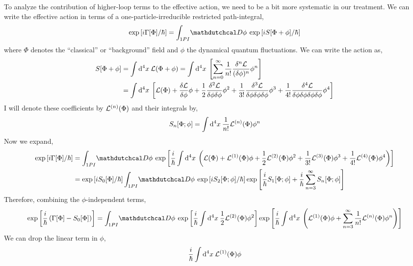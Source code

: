 \documentclass[12pt]{article}
\begin{document}
To analyze the contribution of higher-loop terms to the effective action, we need to be a bit more systematic in our treatment. We can write the effective action in terms of a one-particle-irreducible restricted path-integral,
\[ \exp{\left[ i\Gamma[\Phi] / \hbar \right] } = \int_{1PI} \pathd{\phi} \exp{\left[ i S[\Phi + \phi] / \hbar \right]} \]
where $\Phi$ denotes the ``classical'' or ``background'' field and $\phi$ the dynamical quantum fluctuations. We can write the action as,
\begin{align*}
S[\Phi + \phi] & = \int \mathrm{d}^{4} x \: \mathcal{L}(\Phi + \phi) = \int \mathrm{d}^{4} x \: \left[  \sum_{n = 0}^{\infty} \frac{1}{n!} \frac{\delta^n \mathcal{L}}{(\delta \phi)^n} \phi^n \right]
\\
& = \int \mathrm{d}^{4} x \: \left[  \mathcal{L}(\Phi) + \frac{\delta \mathcal{L}}{\delta \phi} \phi + \frac{1}{2} \frac{\delta^2 \mathcal{L}}{\delta \phi \delta \phi} \phi^2 + \frac{1}{3!} \frac{\delta^3 \mathcal{L}}{\delta \phi \delta \phi \delta \phi} \phi^3 + \frac{1}{4!} \frac{\delta^4 \mathcal{L}}{\delta \phi \delta \phi \delta \phi \delta \phi} \phi^4 \right]
\end{align*} 
I will denote these coefficients by $\mathcal{L}^{(n)}(\Phi)$ and their integrals by,
\[ S_n[\Phi; \phi] = \int \mathrm{d}^{4} x \: \frac{1}{n!} \mathcal{L}^{(n)}(\Phi) \phi^n \]
Now we expand,
\begin{align*}
\exp{\left[ i\Gamma[\Phi] / \hbar \right] } & = \int_{1PI} \pathd{\phi} \exp{\left[ \frac{i}{\hbar} \int \dn{4}{x} \left(  \lagrange(\Phi) + \lagrange^{(1)}(\Phi) \phi + \frac{1}{2} \lagrange^{(2)}(\Phi) \phi^2 + \frac{1}{3!} \lagrange^{(3)}(\Phi) \phi^3 + \frac{1}{4!} \lagrange^{(4)}(\Phi) \phi^4 \right) \right]}
\\
& = \exp{\left[ i S_0[\Phi] / \hbar \right]} \int_{1PI} \pathd{\phi} \exp{\left[ i S_2[\Phi ; \phi] / \hbar \right]} \exp{\left[ \frac{i}{\hbar} S_1[\Phi ; \phi] + \frac{i}{\hbar} \sum_{n = 3}^{\infty} S_n[\Phi ; \phi] \right]}
\end{align*} 
Therefore, combining the $\phi$-independent terms,
\begin{align*}
\exp{\left[ \frac{i}{\hbar} \left( \Gamma[\Phi] - S_0[\Phi] \right) \right]} = \int_{1PI} \pathd{\phi} \exp{\left[ \frac{i}{\hbar} \int \dn{4}{x} \frac{1}{2} \lagrange^{(2)}(\Phi) \phi^2 \right]} \exp{\left[ \frac{i}{\hbar} \int \dn{4}{x} \left( \lagrange^{(1)}(\Phi) \phi + \sum_{n = 3}^{\infty} \frac{1}{n!} \lagrange^{(n)}(\Phi) \phi^n \right) \right]}
\end{align*}
We can drop the linear term in $\phi$,
\[ \frac{i}{\hbar} \int \mathrm{d}^{4} x \:  \mathcal{L}^{(1)}(\Phi) \phi \]
\end{document}

